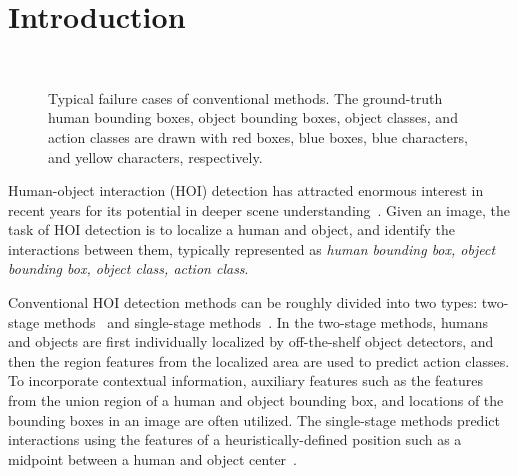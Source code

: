 \documentclass[final]{cvpr}
\begin{document}
\section{Introduction}\label{sec:intro}
\begin{figure}[t]
\centering
{}
 \\
\vspace{-2.0ex}
\caption{Typical failure cases of conventional methods. The ground-truth human bounding boxes, object bounding boxes, object classes, and action classes are drawn with red boxes, blue boxes, blue characters, and yellow characters, respectively.}
\label{fig:fig1_heatmap}
\vspace{-2.0ex}
\end{figure}

Human-object interaction (HOI) detection has attracted enormous interest in recent years for its potential in deeper scene understanding~\cite{chao_wacv2018, gkioxari_cvpr2018, gao_bmvc2018, qi_eccv2018, gupta_iccv2019, li_cvpr2019, wan_iccv2019, wang_iccv2019, zhou_iccv2019, li_cvpr2020, liao_cvpr2020, ulutan_cvpr2020, wang_cvpr2020, zhou_cvpr2020, lin_ijcai2020, yang_ijcai2020, xu_tmm2020, gao_eccv2020, liu_eccv2020, kim_bumsoo_eccv2020, zhi_eccv2020, hai_eccv2020, zhong_eccv2020, kim_dong_eccv2020}. 
Given an image, the task of HOI detection is to localize a human and object, and identify the interactions between them, typically represented as {\it human bounding box, object bounding box, object class, action class}.

Conventional HOI detection methods can be roughly divided into two types: two-stage methods~\cite{chao_wacv2018, gao_eccv2020, gao_bmvc2018, gkioxari_cvpr2018, gupta_iccv2019, zhi_eccv2020, kim_dong_eccv2020, li_cvpr2020, li_cvpr2019, lin_ijcai2020, liu_eccv2020, ulutan_cvpr2020, wan_iccv2019, hai_eccv2020, xu_tmm2020, yang_ijcai2020, zhong_eccv2020, zhou_iccv2019, qi_eccv2018, wang_iccv2019, zhou_cvpr2020} and single-stage methods~\cite{liao_cvpr2020, wang_cvpr2020, kim_bumsoo_eccv2020}. 
In the two-stage methods, humans and objects are first individually localized by off-the-shelf object detectors, and then the region features from the localized area are used to predict action classes.
To incorporate contextual information, auxiliary features such as the features from the union region of a human and object bounding box, and locations of the bounding boxes in an image are often utilized. 
The single-stage methods predict interactions using the features of a heuristically-defined position such as a midpoint between a human and object center~\cite{liao_cvpr2020}.
\end{document}
